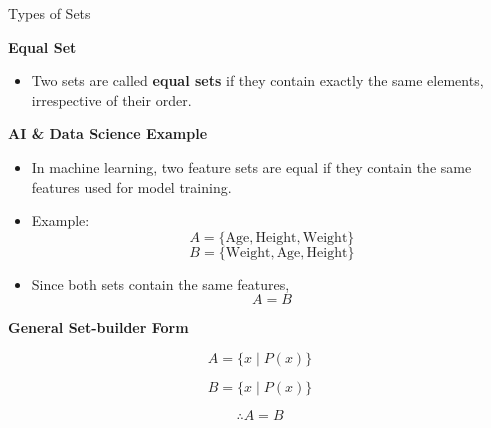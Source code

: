 \documentclass{beamer}
\begin{document}
\begin{frame}{Types of Sets}

\textbf{Equal Set}

\begin{itemize}
    \item Two sets are called \textbf{equal sets} if they contain exactly the same elements, irrespective of their order.
\end{itemize}

\vspace{0.3cm}

\textbf{AI \& Data Science Example}

\begin{itemize}
    \item In machine learning, two feature sets are equal if they contain the same features used for model training.
    \item Example:
    \[
    A=\{\text{Age},\text{Height},\text{Weight}\}
    \]
    \[
    B=\{\text{Weight},\text{Age},\text{Height}\}
    \]
    \item Since both sets contain the same features,
    \[
    A=B
    \]
\end{itemize}

\vspace{0.3cm}

\textbf{General Set-builder Form}

\[
A=\{x \mid P(x)\}
\]

\[
B=\{x \mid P(x)\}
\]

\[
\therefore A=B
\]

\end{frame}
\end{document}

